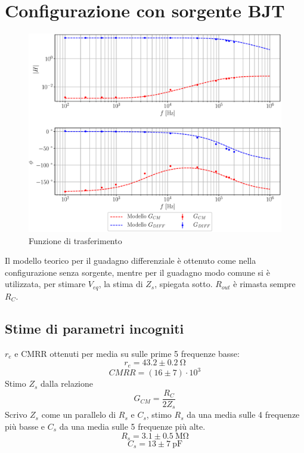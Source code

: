 \documentclass{article}
\begin{document}
\section*{Configurazione con sorgente BJT}
\begin{figure}[h!]
    \centering
    \includegraphics[scale = 0.6]{Grafici/sorgente.eps}
    \caption{Funzione di trasferimento}
    \label{fig:resistenza}
\end{figure}
Il modello teorico per il guadagno differenziale è ottenuto come nella configurazione senza sorgente, mentre per il guadagno modo comune si è utilizzata, per stimare $V_{eq}$, la stima di $Z_s$, spiegata sotto. $R_{out}$ è rimasta sempre $R_C$.

\subsection*{Stime di parametri incogniti}
$r_e$ e CMRR ottenuti per media su sulle prime 5 frequenze basse:
$$ r_e = 43.2\pm 0.2~\si{\ohm}$$
$$ CMRR = (16\pm7)\cdot 10^{3}$$
Stimo $Z_s$ dalla relazione $$G_{CM} = \frac{R_C}{2 Z_s}$$
Scrivo $Z_s$ come un parallelo di $R_s$ e $C_s$, stimo $R_s$ da una media sulle 4 frequenze più basse e $C_s$ da una media sulle 5 frequenze più alte.
$$ R_s = 3.1\pm0.5~\si{\mega\ohm}$$
$$C_s = 13\pm7~\si{\pico\farad}$$
\end{document}
